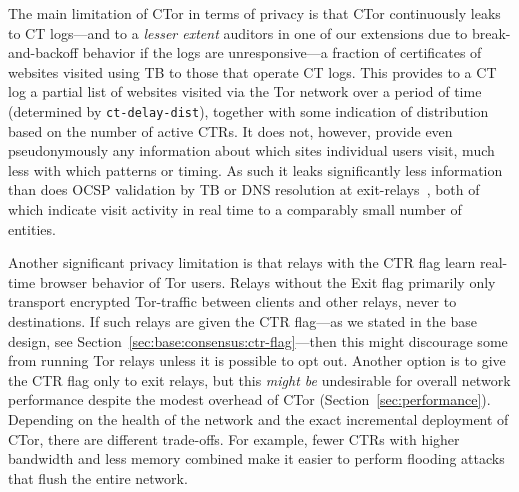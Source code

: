 The main limitation of CTor in terms of privacy is that CTor continuously leaks
to CT logs---and to a \emph{lesser extent} auditors in one of our extensions due
to break-and-backoff behavior if the logs are unresponsive---a fraction of
certificates of websites visited using TB to those that operate CT logs.
This provides
to a CT log a partial list of websites visited via the Tor network over a period
of time (determined by \texttt{ct-delay-dist}), together with some indication of
distribution based on the number of active CTRs. It does not, however, provide
even pseudonymously any information about which sites individual users visit,
much less with which patterns or timing. As such it leaks significantly less
information than does OCSP validation by TB or DNS resolution at
exit-relays~\cite{TorDNS}, both of which indicate visit activity in real time to
a comparably small number of entities.

Another significant privacy limitation is that relays with the CTR flag learn
real-time browser behavior of Tor users. Relays without the Exit flag primarily
only transport encrypted Tor-traffic between clients and other relays, never to
destinations. If such relays are given the CTR flag---as we stated in the base
design, see Section~\ref{sec:base:consensus:ctr-flag}---then this might
discourage some from running Tor relays unless it is possible to opt out.
Another option is to give the CTR flag only to exit relays, but this \emph{might
be} undesirable for overall network performance despite the modest overhead of
CTor (Section~\ref{sec:performance}). Depending on the health of the network
and the exact incremental deployment of CTor, there are different trade-offs.
For example, fewer CTRs with higher bandwidth and less memory combined make it
easier to perform flooding attacks that flush the entire network.
